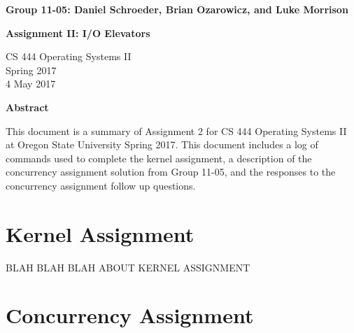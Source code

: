 \documentclass[10pt,letterpaper,draftclsnofoot,onecolumn]{IEEEtran}
\begin{document}
\begin{titlepage}
    \begin{center}
        \vspace*{3.5cm}

        \textbf{Group 11-05: Daniel Schroeder, Brian Ozarowicz, and Luke Morrison}

        \vspace{0.5cm}

        \textbf{Assignment II: I/O Elevators}

        \vspace{0.8cm}

        CS 444 Operating Systems II\\
        Spring 2017\\
        4 May 2017\\

        \vspace{1cm}

        \textbf{Abstract}\\

        \vspace{0.5cm}
			
			This document is a summary of Assignment 2 for CS 444 Operating Systems II at Oregon State University Spring 2017. This document includes a log of commands used to complete the kernel assignment, a description of the concurrency assignment solution from Group 11-05, and the responses to the concurrency assignment follow up questions.\\

        \vfill

    \end{center}
\end{titlepage}


\section{Kernel Assignment}
\bigskip

BLAH BLAH BLAH ABOUT KERNEL ASSIGNMENT\\
\bigskip


\pagebreak

\section{Concurrency Assignment}
\bigskip
\end{document}
